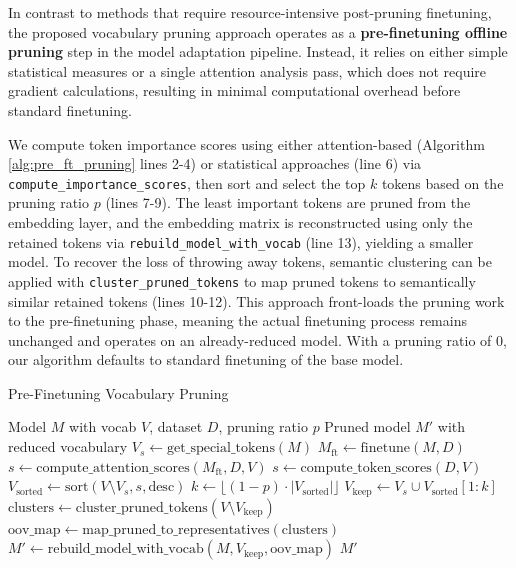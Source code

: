 \documentclass[twocolumn]{article}
\begin{document}
In contrast to methods that require resource-intensive post-pruning finetuning, the proposed vocabulary pruning approach operates as a \textbf{pre-finetuning offline pruning} step in the model adaptation pipeline. 
Instead, it relies on either simple statistical measures or a single attention analysis pass, which does not require gradient calculations, resulting in minimal computational overhead before standard finetuning.


We compute token importance scores using either attention-based (Algorithm \ref{alg:pre_ft_pruning} lines 2-4) or statistical approaches (line 6) via \texttt{compute\_importance\_scores}, then sort and select the top $k$ tokens based on the pruning ratio $p$ (lines 7-9). 
The least important tokens are pruned from the embedding layer, and the embedding matrix is reconstructed using only the retained tokens via \texttt{rebuild\_model\_with\_vocab} (line 13), yielding a smaller model. 
To recover the loss of throwing away tokens, semantic clustering can be applied with \texttt{cluster\_pruned\_tokens} to map pruned tokens to semantically similar retained tokens (lines 10-12). 
This approach front-loads the pruning work to the pre-finetuning phase, meaning the actual finetuning process remains unchanged and operates on an already-reduced model. With a pruning ratio of 0, our algorithm defaults to standard finetuning of the base model.

\begin{algorithm}[H]
\footnotesize
\caption{Pre-Finetuning Vocabulary Pruning}
\label{alg:pre_ft_pruning}
\begin{algorithmic}[1]
\Require Model $M$ with vocab $V$, dataset $D$, pruning ratio $p$
\Ensure Pruned model $M'$ with reduced vocabulary
\State $V_s \gets \text{get\_special\_tokens}(M)$ \Comment{[CLS], [SEP]}
    \State $M_\text{ft} \gets \text{finetune}(M, D)$ 
    \State $s \gets \text{compute\_attention\_scores}(M_\text{ft}, D, V)$ 
\Else
    \State $s \gets \text{compute\_token\_scores}(D, V)$
\EndIf
\State $V_{\text{sorted}} \gets \text{sort}(V \setminus V_s, s, \text{desc})$
\State $k \gets \lfloor (1-p) \cdot |V_{\text{sorted}}| \rfloor$ 
\State $V_{\text{keep}} \gets V_s \cup V_{\text{sorted}}[1:k]$
    \State $\text{clusters} \gets \text{cluster\_pruned\_tokens}(V \setminus V_{\text{keep}})$
    \State $\text{oov\_map} \gets \text{map\_pruned\_to\_representatives}(\text{clusters})$
\EndIf
\State $M' \gets \text{rebuild\_model\_with\_vocab}(M, V_{\text{keep}}, \text{oov\_map})$
\State \Return $M'$
\end{algorithmic}
\end{algorithm}
\end{document}
